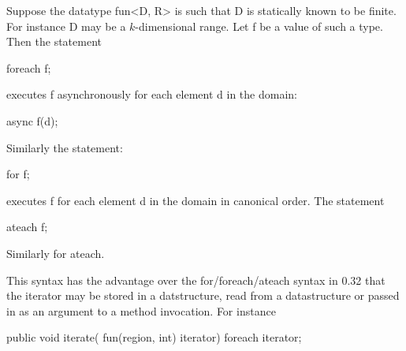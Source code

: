 Suppose the datatype {\cf fun<D, R>} is such that {\cf D} is statically
known to be finite. For instance {\cf D} may be a $k$-dimensional range.
Let {\cf f} be a value of such a type. Then the statement

\begin{x10}
   foreach f;
\end{x10}
\noindent executes {\cf f} asynchronously for each element {\cf d} in
the domain:
\begin{x10}
    async { f(d); }  
\end{x10}
Similarly the statement:
\begin{x10}
    for f;
\end{x10}
executes {\cf f} for each element {\cf d} in the domain in canonical order.
The statement
\begin{x10}
    ateach f;
\end{x10}
Similarly for ateach. 

This syntax has the advantage over the for/foreach/ateach syntax in
0.32 that the iterator may be stored in a datstructure, read from a
datastructure or passed in as an argument to a method invocation. For
instance

    public void iterate( fun(region, int) iterator) {
           foreach iterator;
    }
       


